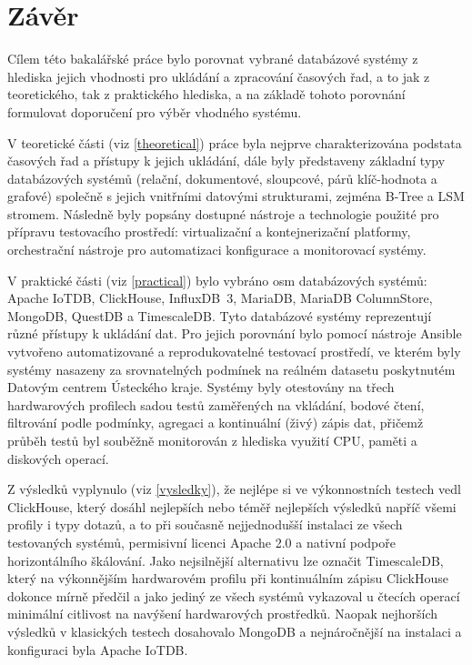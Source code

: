 \chapter{Závěr}
Cílem této bakalářské práce bylo porovnat vybrané databázové systémy z hlediska jejich vhodnosti pro ukládání a zpracování časových řad, a to jak z teoretického, tak z praktického hlediska, a na základě tohoto porovnání formulovat doporučení pro výběr vhodného systému.

V teoretické části (viz \ref{theoretical}) práce byla nejprve charakterizována podstata časových řad a přístupy k jejich ukládání, dále byly představeny základní typy databázových systémů (relační, dokumentové, sloupcové, párů klíč-hodnota a grafové) společně s jejich vnitřními datovými strukturami, zejména B-Tree a LSM stromem. 
Následně byly popsány dostupné nástroje a technologie použité pro přípravu testovacího prostředí: virtualizační a kontejnerizační platformy, orchestrační nástroje pro automatizaci konfigurace a monitorovací systémy.

V praktické části (viz \ref{practical}) bylo vybráno osm databázových systémů: Apache IoTDB, ClickHouse, \mbox{InfluxDB 3}, MariaDB, MariaDB ColumnStore, MongoDB, QuestDB a TimescaleDB. Tyto databázové systémy reprezentují různé přístupy k ukládání dat. 
Pro jejich porovnání bylo pomocí nástroje Ansible vytvořeno automatizované a reprodukovatelné testovací prostředí, ve kterém byly systémy nasazeny za srovnatelných podmínek na reálném datasetu poskytnutém Datovým centrem Ústeckého kraje. 
Systémy byly otestovány na třech hardwarových profilech sadou testů zaměřených na vkládání, bodové čtení, filtrování podle podmínky, agregaci a kontinuální (živý) zápis dat, přičemž průběh testů byl souběžně monitorován z hlediska využití CPU, paměti a diskových operací.

Z výsledků vyplynulo (viz \ref{vysledky}), že nejlépe si ve výkonnostních testech vedl ClickHouse, který dosáhl nejlepších nebo téměř nejlepších výsledků napříč všemi profily i typy dotazů, a to při současně nejjednodušší instalaci ze všech testovaných systémů, permisivní licenci Apache 2.0 a nativní podpoře horizontálního škálování. 
Jako nejsilnější alternativu lze označit TimescaleDB, který na výkonnějším hardwarovém profilu při kontinuálním zápisu ClickHouse dokonce mírně předčil a jako jediný ze všech systémů vykazoval u čtecích operací minimální citlivost na navýšení hardwarových prostředků. 
Naopak nejhorších výsledků v klasických testech dosahovalo MongoDB a nejnáročnější na instalaci a konfiguraci byla Apache IoTDB.

